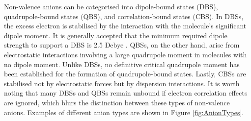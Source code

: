 Non-valence anions can be categorised into dipole-bound states (DBS)\cite{fermi1947capture,desfranccois1996abdoul,gutowski1996contribution,jordan2003theory,qian2019probing}, quadrupole-bound states (QBS)\cite{jordan1979binding,desfranccois2004long,sommerfeld2014excess}, and correlation-bound states (CBS)\cite{sommerfeld2010correlation,voora2013existence,voora2014nonvalence,voora2017theoretical}.
In DBSs, the excess electron is stabilised by the interaction with the molecule's significant dipole moment. It is generally accepted that the minimum required dipole strength to support a DBS is 2.5 Debye \cite{jordan2003theory}. QBSs, on the other hand, arise from electrostatic interactions involving a large quadrupole moment in molecules with no dipole moment. Unlike DBSs, no definitive critical quadrupole moment has been established for the formation of quadrupole-bound states\cite{sommerfeld2014excess}. Lastly, CBSs are stabilised not by electrostatic forces but by dispersion interactions. It is worth noting that many DBSs and QBSs remain unbound if electron correlation effects are ignored, which blurs the distinction between these types of non-valence anions\cite{voora2017theoretical}. Examples of different anion types are shown in Figure \ref{fig:AnionTypes}.\\

